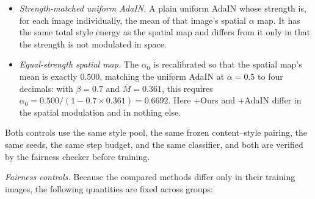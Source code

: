 \begin{itemize}
\item \textit{Strength-matched uniform AdaIN.} A plain uniform AdaIN whose strength is, for each image individually, the mean of that image's spatial $\alpha$ map. It has the same total style energy as the spatial map and differs from it only in that the strength is not modulated in space.
\item \textit{Equal-strength spatial map.} The $\alpha_0$ is recalibrated so that the spatial map's mean is exactly $0.500$, matching the uniform AdaIN at $\alpha = 0.5$ to four decimals: with $\beta = 0.7$ and $\overline{M} = 0.361$, this requires $\alpha_0 = 0.500 / (1 - 0.7 \times 0.361) = 0.6692$. Here +Ours and +AdaIN differ in the spatial modulation and in nothing else.
\end{itemize}

Both controls use the same style pool, the same frozen content--style pairing, the same seeds, the same step budget, and the same classifier, and both are verified by the fairness checker before training.

\textit{Fairness controls.} Because the compared methods differ only in their training images, the following quantities are fixed across groups:

